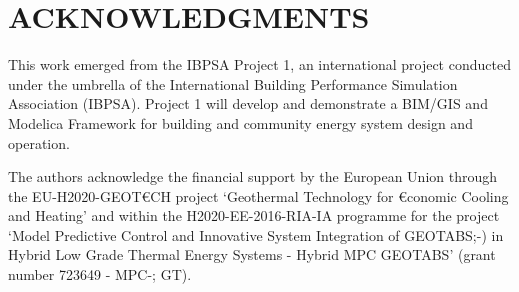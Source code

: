 \documentclass[10pt]{extarticle}
\begin{document}
%
%


\section*{ACKNOWLEDGMENTS}

This work emerged from the IBPSA Project 1, an international project conducted under the umbrella of the International Building Performance Simulation Association (IBPSA). Project 1 will develop and demonstrate a BIM/GIS and Modelica Framework for building and community energy system design and operation.

The authors acknowledge the financial support by the European Union through  the EU-H2020-GEOT\euro CH 
project ‘Geothermal Technology for \euro conomic Cooling and Heating’ 
and within the H2020-EE-2016-RIA-IA programme for the project ‘Model Predictive Control and Innovative System Integration of GEOTABS;-) 
in Hybrid Low Grade Thermal Energy Systems - Hybrid MPC GEOTABS’ (grant number 723649 - MPC-; GT). 
\end{document}
